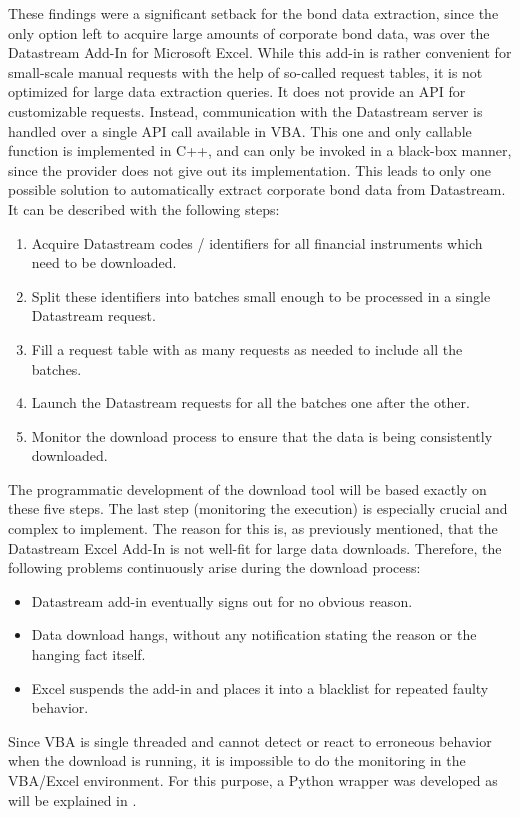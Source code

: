 These findings were a significant setback for the bond data extraction, since the only option left to acquire large amounts of corporate bond data, was over the Datastream Add-In for Microsoft Excel. While this add-in is rather convenient for small-scale manual requests with the help of so-called request tables, it is not optimized for large data extraction queries. It does not provide an API for customizable requests. Instead, communication with the Datastream server is handled over a single API call available in VBA. This one and only callable function is implemented in C++, and can only be invoked in a black-box manner, since the provider does not give out its implementation. This leads to only one possible solution to automatically extract corporate bond data from Datastream. It can be described with the following steps: 
\begin{enumerate}
		\item Acquire Datastream codes / identifiers for all financial instruments which need to be downloaded.
		\item Split these identifiers into batches small enough to be processed in a single Datastream request.
		\item Fill a request table with as many requests as needed to include all the batches. 
		\item Launch the Datastream requests for all the batches one after the other. 
		\item Monitor the download process to ensure that the data is being consistently downloaded. 
\end{enumerate}
The programmatic development of the download tool will be based exactly on these five steps. The last step (monitoring the execution) is especially crucial and complex to implement. The reason for this is, as previously mentioned, that the Datastream Excel Add-In is not well-fit for large data downloads. Therefore, the following problems continuously arise during the download process: 
\begin{itemize}
	\item Datastream add-in eventually signs out for no obvious reason. 
	\item Data download hangs, without any notification stating the reason or the hanging fact itself. 
	\item Excel suspends the add-in and places it into a blacklist for repeated faulty behavior. 
\end{itemize}
Since VBA is single threaded and cannot detect or react to erroneous behavior when the download is running, it is impossible to do the monitoring in the VBA/Excel environment. For this purpose, a Python wrapper was developed as will be explained in .%

